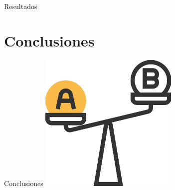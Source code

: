 \documentclass[11pt]{beamer}
\begin{document}
\begin{frame}{Resultados}
    \begin{figure}%
    \centering
    \qquad
    \end{figure}
\end{frame}

\section{Conclusiones}
\begin{frame}{Conclusiones}
\centering
\includegraphics[width=0.5\textwidth]{imagenes/comparacion.jpg}
\end{frame}
	
\end{document}
